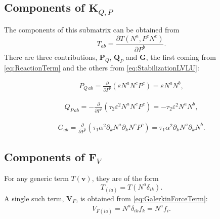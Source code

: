 \subsection{Components of $\mathbf{K}_{Q, P}$} \label{sec:KQPComponents}
The components of this submatrix can be obtained from
\begin{equation} \label{eq:GenericMatrixQP}
  T_{ab} = \frac{\partial T(N^a, P^c N^c)}{\partial P^b}.
\end{equation}
There are three contributions, $\mathbf{P}_Q$, $\mathbf{Q}_P$ and  $\mathbf{G}$, the first coming from \cref{eq:ReactionTerm} and the others from \cref{eq:StabilizationLVLU}:

\begin{align} \label{eq:PQLHS}
  P_{Q\, ab} = \frac{\partial }{\partial P^b} \left( \varepsilon  N^a N^c P^c\right) = \varepsilon N^a N^b,
\end{align}

\begin{align} \label{eq:QPLHSStabilizationTerm}
  Q_{P\, ab} = -\frac{\partial }{\partial P^b} \left( \tau_2 \varepsilon ^2 N^a N^c P^c\right) = -\tau_2 \varepsilon ^2 N^a N^b,
\end{align}

\begin{align} \label{eq:GLHSStabilizationTerm}
  G_{ab} = \frac{\partial }{\partial P^b} \left( \tau_1 \alpha^2 \partial_k N^a \partial_k N^c P^c\right) = \tau_1 \alpha^2 \partial_k N^a \partial_k N^b.
\end{align}

\subsection{Components of $\mathbf{F}_{V}$}  \label{sec:FVComponents}
For any generic term $T(\boldsymbol{v})$, they are of the form
\begin{equation} \label{eq:GenericVFTerm}
  T_{(ia)} = T(N^a \delta_{ik}).
\end{equation}
A single such term, $\boldsymbol{V}_F$, is obtained from \cref{eq:GalerkinForceTerm}:
\begin{align} \label{eq:GTerm}
  V_{F(ia)} =  N^a \delta_{ik}f_k = N^a f_i.
\end{align}

